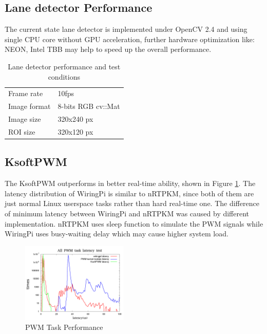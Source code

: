 \documentclass[conference]{IEEEtran}
\begin{document}
\subsection{Lane detector Performance}

The current state lane detector is implemented under OpenCV 2.4 and using single CPU core without GPU acceleration, further hardware optimization like: NEON, Intel TBB may help to speed up the overall performance.

\begin{table}[!htbp]
	\centering
	\caption{Lane detector performance and test conditions}
	\label{lane_detector_condition}
	\begin{tabular}{ll}
		Frame rate                      &10fps \\
		Image format                    &8-bits RGB cv::Mat \\
		Image size                      &320x240 px	 \\	
		ROI size                       &320x120 px
	\end{tabular}
\end{table}

\subsection{KsoftPWM}

The KsoftPWM outperforms in better real-time ability, shown in Figure \ref{fig:ksoftpwm_perf}. The latency distribution of WiringPi is similar to nRTPKM, since both of them are just normal Linux userspace tasks rather than hard real-time one. The difference of minimum latency between WiringPi and nRTPKM was caused by different implementation. nRTPKM uses sleep function to simulate the PWM signals while WiringPi uses busy-waiting delay which may cause higher system load.

\begin{figure}
	\centering
	\includegraphics[width=2in]{img/ksoftpwm_load.png}
	\caption{PWM Task Performance}
	\label{fig:ksoftpwm_perf}
\end{figure}
\end{document}
